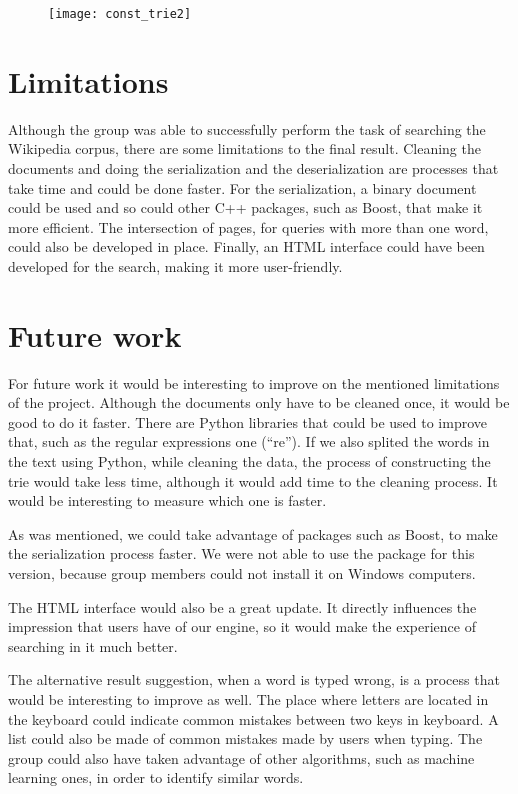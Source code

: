 \documentclass{article}
\begin{document}
\begin{figure}[h!]
 \centering
  \texttt{[image: const\_trie2]}
 \end{figure}

\section*{Limitations}
Although the group was able to successfully perform the task of searching the Wikipedia corpus, there are some limitations to the final result. Cleaning the documents and doing the serialization and the deserialization are processes that take time and could be done faster. For the serialization, a binary document could be used and so could other C++ packages, such as Boost, that make it more efficient. The intersection of pages, for queries with more than one word, could also be developed in place. Finally, an HTML interface could have been developed for the search, making it more user-friendly.

\section*{Future work}
For future work it would be interesting to improve on the mentioned limitations of the project. Although the documents only have to be cleaned once, it would be good to do it faster. There are Python libraries that could be used to improve that, such as the regular expressions one (``re''). If we also splited the words in the text using Python, while cleaning the data, the process of constructing the trie would take less time, although it would add time to the cleaning process. It would be interesting to measure which one is faster.

As was mentioned, we could take advantage of packages such as Boost, to make the serialization process faster. We were not able to use the package for this version, because group members could not install it on Windows computers. 

The HTML interface would also be a great update. It directly influences the impression that users have of our engine, so it would make the experience of searching in it much better. 

The alternative result suggestion, when a word is typed wrong, is a process that would be interesting to improve as well. The place where letters are located in the keyboard could indicate common mistakes between two keys in keyboard. A list could also be made of common mistakes made by users when typing. The group could also have taken advantage of other algorithms, such as machine learning ones, in order to identify similar words. 
\end{document}
